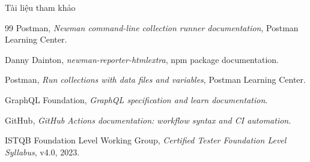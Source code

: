 \documentclass[aspectratio=169,10pt]{beamer}
\begin{document}
\begin{frame}[shrink=1]{Tài liệu tham khảo}
  \begin{thebibliography}{99}
    Postman,
    \textit{Newman command-line collection runner documentation},
    Postman Learning Center.

    Danny Dainton,
    \textit{newman-reporter-htmlextra}, npm package documentation.

    Postman,
    \textit{Run collections with data files and variables},
    Postman Learning Center.

    GraphQL Foundation,
    \textit{GraphQL specification and learn documentation}.

    GitHub,
    \textit{GitHub Actions documentation: workflow syntax and CI automation}.

    ISTQB Foundation Level Working Group,
    \textit{Certified Tester Foundation Level Syllabus}, v4.0, 2023.
  \end{thebibliography}
\end{frame}
\end{document}
